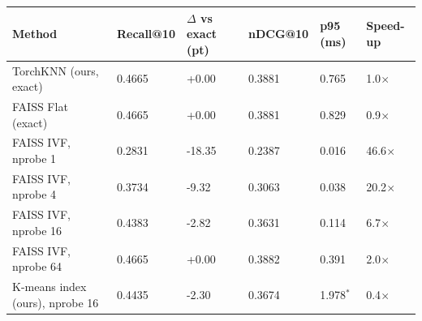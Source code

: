 \begin{tabular}{llllll}
\hline
Method & Recall@10 & $\Delta$ vs exact (pt) & nDCG@10 & p95 (ms) & Speed-up \\
\hline
TorchKNN (ours, exact) & 0.4665 & +0.00 & 0.3881 & 0.765 & 1.0$\times$ \\
FAISS Flat (exact) & 0.4665 & +0.00 & 0.3881 & 0.829 & 0.9$\times$ \\
FAISS IVF, nprobe 1 & 0.2831 & -18.35 & 0.2387 & 0.016 & 46.6$\times$ \\
FAISS IVF, nprobe 4 & 0.3734 & -9.32 & 0.3063 & 0.038 & 20.2$\times$ \\
FAISS IVF, nprobe 16 & 0.4383 & -2.82 & 0.3631 & 0.114 & 6.7$\times$ \\
FAISS IVF, nprobe 64 & 0.4665 & +0.00 & 0.3882 & 0.391 & 2.0$\times$ \\
K-means index (ours), nprobe 16 & 0.4435 & -2.30 & 0.3674 & 1.978$^{*}$ & 0.4$\times$ \\
\hline
\end{tabular}
